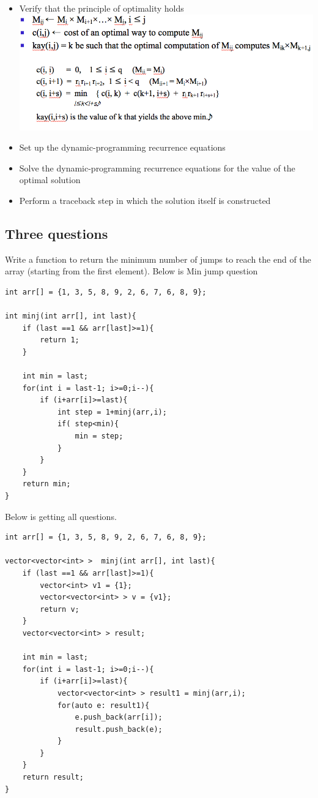 \documentclass[a4paper,11pt,twoside]{book}
\begin{document}
	\begin{itemize}
		\item Verify that the principle of optimality holds  \newline
		\includegraphics[scale=0.45]{pics/Recurrence.png} \newline
		
		\item Set up the dynamic-programming recurrence equations
		\item Solve the dynamic-programming recurrence equations for the value of the optimal solution
		\item Perform a traceback step in which the solution itself is constructed
	\end{itemize}
	
\subsection{Three questions}

	\par Write a function to return the minimum number of jumps to reach the end of the array (starting from the first element). Below is Min jump question
	
\begin{lstlisting}[numbers=none]
int arr[] = {1, 3, 5, 8, 9, 2, 6, 7, 6, 8, 9};

int minj(int arr[], int last){		
	if (last ==1 && arr[last]>=1){
		return 1;
	}
	
	int min = last;
	for(int i = last-1; i>=0;i--){
		if (i+arr[i]>=last){
			int step = 1+minj(arr,i);
			if( step<min){
				min = step;
			}
		}    
	}
	return min;
}		
\end{lstlisting} 		
	
	
	\par Below is getting all questions.  
\begin{lstlisting}[numbers=none]
int arr[] = {1, 3, 5, 8, 9, 2, 6, 7, 6, 8, 9};

vector<vector<int> >  minj(int arr[], int last){	
	if (last ==1 && arr[last]>=1){
		vector<int> v1 = {1};
		vector<vector<int> > v = {v1};
		return v;
	}	
	vector<vector<int> > result;
	
	int min = last;
	for(int i = last-1; i>=0;i--){
		if (i+arr[i]>=last){
			vector<vector<int> > result1 = minj(arr,i);
			for(auto e: result1){
				e.push_back(arr[i]);
				result.push_back(e);
			}
		}
	}
	return result;
}					
\end{lstlisting} 	
	
\end{document}
